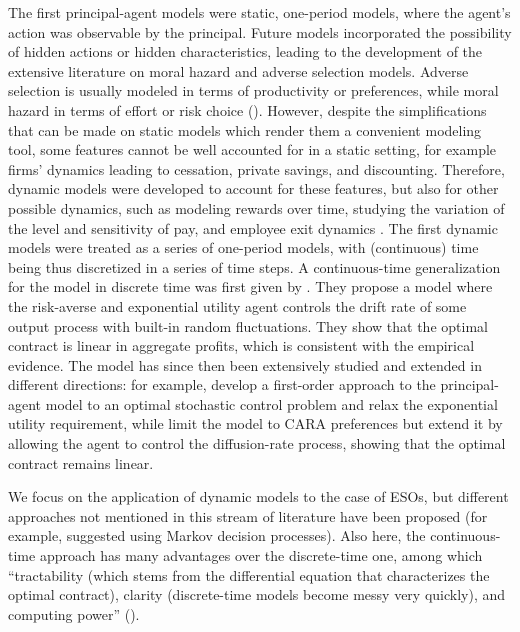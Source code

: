     The first principal-agent models were static, one-period models, where the agent's action was observable by the principal. Future models incorporated the possibility of hidden actions or hidden characteristics, leading to the development of the extensive literature on moral hazard and adverse selection models. Adverse selection is usually modeled in terms of productivity or preferences, while moral hazard in terms of effort or risk choice (\cite{cvitanic2017moral}). However, despite the simplifications that can be made on static models which render them a convenient modeling tool, some features cannot be well accounted for in a static setting, for example firms' dynamics leading to cessation, private savings, and discounting. Therefore, dynamic models were developed to account for these features, but also for other possible dynamics, such as modeling rewards over time, studying the variation of the level and sensitivity of pay, and employee exit dynamics \cite{edmans2017executive}. The first dynamic models were treated as a series of one-period models, with (continuous) time being thus discretized in a series of time steps. A continuous-time generalization for the model in discrete time was first given by \cite{holmstrom1987aggregation}. They propose a model where the risk-averse and exponential utility agent controls the drift rate of some output process with built-in random fluctuations. They show that the optimal contract is linear in aggregate profits, which is consistent with the empirical evidence. The model has since then been extensively studied and extended in different directions: for example, \cite{schattler1993first} develop a first-order approach to the principal-agent model to an optimal stochastic control problem and relax the exponential utility requirement, while \cite{sung1995linearity} limit the model to CARA preferences but extend it by allowing the agent to control the diffusion-rate process, showing that the optimal contract remains linear.

    We focus on the application of dynamic models to the case of ESOs, but different approaches not mentioned in this stream of literature have been proposed (for example, \cite{plambeck2000performance} suggested using Markov decision processes). 
    Also here, the continuous-time approach has many advantages over the discrete-time one, among which ``tractability (which stems from the differential equation that characterizes the optimal contract), clarity (discrete-time models become messy very quickly), and computing power'' (\cite{sannikov2013contracts}).  

